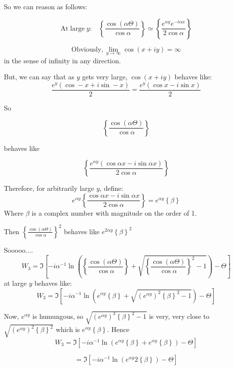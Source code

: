 \documentclass{article}
\begin{document}
So we can reason as follows:

\[ \mathrm{At \; large \; }y: \;\;\; \left\{ \frac{\cos(\alpha \Theta)}{\cos \alpha} \right\}
\simeq
\left\{ \frac{e^{\alpha y} e^{- i \alpha x}}{2 \cos \alpha} \right\}  \]

\[ \mathrm{Obviously,} \lim_{y \rightarrow \infty} \cos (x + iy) = \infty \]
in the sense of infinity in any direction.

But, we can say that as $y$ gets very large, $\cos (x+iy)$ behaves like:
\[ \frac{e^{y}(\cos -x + i\sin -x)}{2} = \frac{e^{y}(\cos x - i\sin x)}{2} \]

\parbox{0.5 cm}{So}
\parbox{2 cm}{ \[ \left\{ \frac{\cos(\alpha \Theta)}{\cos \alpha} \right\} \]}
\parbox{2 cm}{behaves like}
\parbox{3 cm}{\[ \left\{ \frac{e^{\alpha y}(\cos \alpha x - i \sin \alpha x)}{2 \cos \alpha} \right\} \]}

Therefore, for arbitrarily large $y$, define:
\[ e^{\alpha y} \left\{ \frac{\cos \alpha x - i \sin \alpha x }{2 \cos \alpha} \right\} = e^{\alpha y} \left\{ \beta \right\} \] 
Where $\beta$ is a complex number with magnitude on the order of 1.


Then  $ \left\{ \frac{\cos(\alpha \Theta)}{\cos \alpha} \right\}^{2} $
behaves like $ e^{2 \alpha y} \left\{ \beta \right\}^{2} $

Sooooo....
\[ W_{3} = \Im \left[  
 - i \alpha^{-1} \ln \left(
 \left\{ \frac{\cos(\alpha \Theta)}{\cos \alpha} \right\}
 + \sqrt{\left\{ \frac{\cos(\alpha \Theta)}{\cos \alpha} \right\}^{2} - 1} \right) 
  - \Theta  \right] \]
  at large $y$ behaves like:
  \[ W_{3} = \Im \left[  
 - i \alpha^{-1} \ln \left(
  e^{\alpha y} \left\{ \beta \right\}
 + \sqrt{ (e^{\alpha y})^{2} \left\{ \beta \right\}^{2} - 1} \right) 
  - \Theta  \right] \]

Now, $e^{\alpha y}$ is humungous, so $\sqrt{ (e^{\alpha y})^{2} \left\{ \beta \right\}^{2} - 1}$ is very, very close to $\sqrt{ (e^{\alpha y})^{2} \left\{ \beta \right\}^{2}}$ which is $e^{\alpha y} \left\{ \beta \right\}$. Hence
\[ W_{3} = \Im \left[  
 - i \alpha^{-1} \ln \left(
  e^{\alpha y} \left\{ \beta \right\}
 + e^{\alpha y} \left\{ \beta \right\} \right) 
  - \Theta  \right] \]
  
\[ = \Im \left[  
 - i \alpha^{-1} \ln \left(
  e^{\alpha y} 2 \left\{ \beta \right\} \right) 
  - \Theta  \right] \]
  
\end{document}
